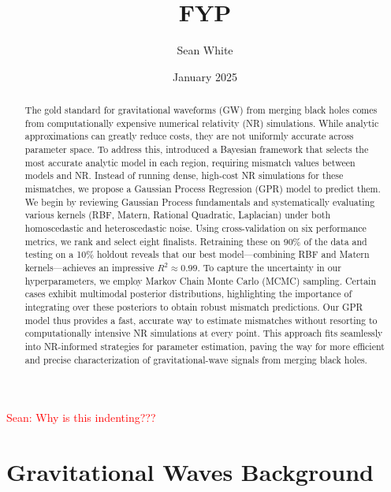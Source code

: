 \documentclass[10pt]{article}
\title{FYP }
\author{Sean White}
\date{January 2025}
\newcommand{\Sean}[1]{{\textcolor{red}{{Sean: #1}} }}
\begin{document}
\maketitle
\Sean{Why is this indenting???}
\begin{abstract}The gold standard for gravitational waveforms (GW) from merging black holes comes from computationally expensive numerical relativity (NR) simulations. While analytic approximations can greatly reduce costs,
 they are not uniformly accurate across parameter space. To address this, \cite{Ogpaper} introduced a Bayesian framework that selects the most accurate analytic model in each region, requiring mismatch values between models and NR. Instead of running dense,
  high-cost NR simulations for these mismatches, we propose a Gaussian Process Regression (GPR) model to predict them.
We begin by reviewing Gaussian Process fundamentals and systematically evaluating various kernels (RBF, Matern, Rational Quadratic, Laplacian) under both homoscedastic and heteroscedastic noise.
 Using cross-validation on six performance metrics, we rank and select eight finalists. Retraining these on 90\% of the data and testing on a 10\% holdout reveals that our best model—combining RBF
  and Matern kernels—achieves an impressive \(R^2 \approx 0.99\).
To capture the uncertainty in our hyperparameters, we employ Markov Chain Monte Carlo (MCMC) sampling. 
Certain cases exhibit multimodal posterior distributions, highlighting the importance of integrating over these posteriors to obtain robust mismatch predictions.
Our GPR model thus provides a fast, accurate way to estimate mismatches without resorting to computationally intensive NR simulations at every point.
 This approach fits seamlessly into NR-informed strategies for parameter estimation, paving the way for more efficient and precise characterization of gravitational-wave signals from merging black holes.
\end{abstract}

\section{Gravitational Waves Background}
\end{document}
